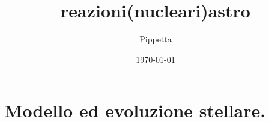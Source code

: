 \documentclass[oneside,12pt,fleqn]{memoir}
\author{Pippetta}
\title{reazioni(nucleari)astro}
\date{\today}
\begin{document}
\frontmatter
\maketitle
{}
\tableofcontents*

\mainmatter

\part{Modello ed evoluzione stellare.}
%

\renewcommand{\listfigurename}{Elenco figure}

\renewcommand{\indexname}{Indice}

\listoffigures
\printindex
\end{document}
